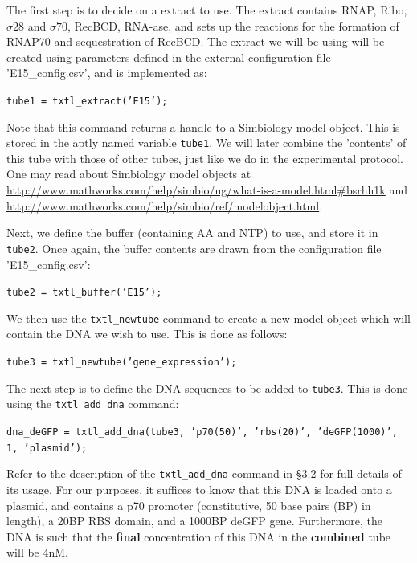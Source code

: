 \documentclass[english]{report}
\begin{document}
		The first step is to decide on a extract to use. The extract contains RNAP, Ribo, $\sigma 28$ and $\sigma 70$, RecBCD, RNA-ase, and sets up the reactions for the formation of RNAP70 and sequestration of RecBCD. The extract we will be using will be created using parameters defined in the external configuration file \textsf{'E15\_config.csv'}, and is implemented as: 
		
				\begin{flushleft}
						\texttt{tube1 = txtl\_extract('E15');} 
				\end{flushleft}	
				
				Note that this command returns a handle to a Simbiology model object. This is stored in the aptly named variable \texttt{tube1}. We will later combine the 'contents' of this tube with those of other tubes, just like we do in the experimental protocol. One may read about Simbiology model objects at \url{http://www.mathworks.com/help/simbio/ug/what-is-a-model.html#bsrhh1k} and \url{http://www.mathworks.com/help/simbio/ref/modelobject.html}.
				
Next, we define the buffer (containing AA and NTP) to use, and store it in \texttt{tube2}. Once again, the buffer contents are drawn from the configuration file \textsf{'E15\_config.csv'}:

				\begin{flushleft}
						\texttt{tube2 = txtl\_buffer('E15');} \\	
				\end{flushleft}	 
		
We then use the \texttt{txtl\_newtube} command to create a new model object which will contain the DNA we wish to use. This is done as follows:
		
				\begin{flushleft}
						\texttt{tube3 = txtl\_newtube('gene\_expression');} \\	
				\end{flushleft}	 
				
The next step is to define the DNA sequences to be added to \texttt{tube3}. This is done using the \texttt{txtl\_add\_dna} command:

				\begin{flushleft}
						\texttt{dna\_deGFP = txtl\_add\_dna(tube3, 'p70(50)', 'rbs(20)', 'deGFP(1000)', 1, 'plasmid');} \\	
				\end{flushleft}
Refer to the description of the \texttt{txtl\_add\_dna} command in \S 3.2 for full details of its usage. For our purposes, it suffices to know that this DNA is loaded onto a plasmid, and contains a p70 promoter (constitutive, 50 base pairs (BP) in length), a 20BP RBS domain, and a 1000BP deGFP gene. Furthermore, the DNA is such that the \textbf{final} concentration of this DNA in the \textbf{combined} tube will be 4nM. 
\end{document}
